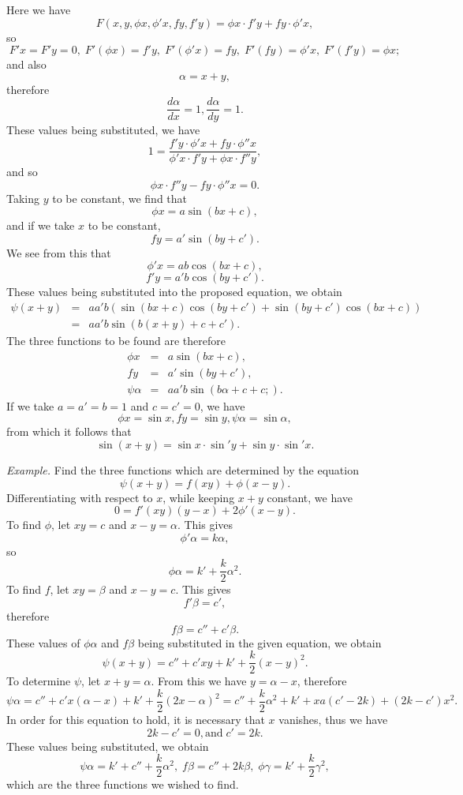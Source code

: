 \documentclass[12pt]{article}
\begin{document}
Here we have 
\[ F(x,y, \phi x,\phi'x,fy,f'y) = \phi x \cdot f'y + fy \cdot \phi'x, \]
so
\[ F'x = F'y = 0, \; F'(\phi x) = f'y, \; F'(\phi' x) = fy, \; F'(fy) = \phi' x, \; F'(f'y) = \phi x; \] 
and also 
\[ \alpha = x+y, \]
therefore
\[ \frac{d\alpha}{dx} = 1, \frac{d\alpha}{dy} = 1. \]
These values being substituted, we have 
\[ 1 = \frac{f'y \cdot \phi'x + fy \cdot \phi'' x}{\phi' x \cdot f'y + \phi x \cdot f''y} , \]
and so
\[ \phi x \cdot f'' y - fy \cdot \phi''x = 0. \]
Taking $y$ to be constant, we find that 
\[ \phi x = a \sin(bx + c), \]
and if we take $x$ to be constant, 
\[ fy = a' \sin (by + c') .\]
We see from this that 
\[ \phi' x = ab \cos(bx + c), \]
\[ f'y = a'b \cos(by + c'). \]
These values being substituted into the proposed equation, we obtain
\begin{eqnarray*} \psi(x+y) &=& aa'b\left (\sin(bx+c)\cos(by+c') + \sin(by+c')\cos(bx+c)\right) \\
&=& aa'b \sin\left(b(x+y) + c + c'\right). \end{eqnarray*}
The three functions to be found are therefore
\begin{eqnarray*} \phi x &=& a \sin(bx +c), \\
 fy &=& a'\sin(by+c'), \\
 \psi \alpha &=& aa'b\sin(b \alpha + c + c;). \end{eqnarray*}
If we take $a = a' = b = 1$ and $c = c' = 0$, we have 
\[ \phi x = \sin x, f y = \sin y, \psi \alpha = \sin \alpha, \]
from which it follows that 
\[ \sin(x+y) = \sin x \cdot \sin' y + \sin y \cdot \sin ' x .\]

\textit{Example.} Find the three functions which are determined by the equation
\[ \psi(x+y) = f(xy) + \phi(x-y). \]
Differentiating with respect to $x$, while keeping $x+y$ constant, we have
\[ 0 = f'(xy)(y-x) + 2\phi'(x-y). \]
To find $\phi$, let $xy = c$ and $x-y = \alpha$.  This gives
\[ \phi' \alpha = k \alpha, \]
so
\[ \phi \alpha = k' + \frac{k}{2} \alpha^2 .\]
To find $f$, let $xy = \beta$ and $x-y = c$.  This gives
\[ f'\beta = c', \]
therefore 
\[ f\beta = c'' + c'\beta. \]
These values of $\phi \alpha$ and $f \beta$ being substituted in the given equation, we obtain
\[ \psi(x+y) = c'' + c' xy + k' + \frac{k}{2} (x-y)^2. \]
To determine $\psi$, let $x+y = \alpha$.  From this we have $y = \alpha - x$, therefore
\[\psi \alpha = c'' + c' x(\alpha - x) + k' + \frac{k}{2} (2x-\alpha)^2 = c'' + \frac{k}{2} \alpha^2 + k' + xa(c'-2k) + (2k-c')x^2. \]
In order for this equation to hold, it is necessary that $x$ vanishes, thus we have
\[ 2k-c' = 0, \mathrm{and} \; c' = 2k .\]
These values being substituted, we obtain
\[ \psi \alpha = k' + c'' + \frac{k}{2} \alpha^2, \; f \beta = c'' + 2k\beta, \; \phi \gamma = k' + \frac{k}{2} \gamma^2, \]
which are the three functions we wished to find.
\end{document}
